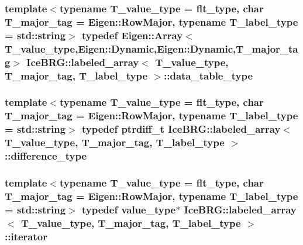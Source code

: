 \subsubsection[{data\+\_\+table\+\_\+type}]{\setlength{\rightskip}{0pt plus 5cm}template$<$typename T\+\_\+value\+\_\+type = flt\+\_\+type, char T\+\_\+major\+\_\+tag = Eigen\+::\+Row\+Major, typename T\+\_\+label\+\_\+type = std\+::string$>$ typedef Eigen\+::\+Array$<$T\+\_\+value\+\_\+type,Eigen\+::\+Dynamic,Eigen\+::\+Dynamic,T\+\_\+major\+\_\+tag$>$ {\bf Ice\+B\+R\+G\+::labeled\+\_\+array}$<$ T\+\_\+value\+\_\+type, T\+\_\+major\+\_\+tag, T\+\_\+label\+\_\+type $>$\+::{\bf data\+\_\+table\+\_\+type}}\label{classIceBRG_1_1labeled__array_a43d1c710fe591f9610ab9e9827aabba6}
\hypertarget{classIceBRG_1_1labeled__array_af916a9e5d8e921f4fd310618f065e0fd}{}
\subsubsection[{difference\+\_\+type}]{\setlength{\rightskip}{0pt plus 5cm}template$<$typename T\+\_\+value\+\_\+type = flt\+\_\+type, char T\+\_\+major\+\_\+tag = Eigen\+::\+Row\+Major, typename T\+\_\+label\+\_\+type = std\+::string$>$ typedef ptrdiff\+\_\+t {\bf Ice\+B\+R\+G\+::labeled\+\_\+array}$<$ T\+\_\+value\+\_\+type, T\+\_\+major\+\_\+tag, T\+\_\+label\+\_\+type $>$\+::{\bf difference\+\_\+type}}\label{classIceBRG_1_1labeled__array_af916a9e5d8e921f4fd310618f065e0fd}
\hypertarget{classIceBRG_1_1labeled__array_a15c8011c5051008033578e5e50e25820}{}
\subsubsection[{iterator}]{\setlength{\rightskip}{0pt plus 5cm}template$<$typename T\+\_\+value\+\_\+type = flt\+\_\+type, char T\+\_\+major\+\_\+tag = Eigen\+::\+Row\+Major, typename T\+\_\+label\+\_\+type = std\+::string$>$ typedef {\bf value\+\_\+type}$\ast$ {\bf Ice\+B\+R\+G\+::labeled\+\_\+array}$<$ T\+\_\+value\+\_\+type, T\+\_\+major\+\_\+tag, T\+\_\+label\+\_\+type $>$\+::{\bf iterator}}\label{classIceBRG_1_1labeled__array_a15c8011c5051008033578e5e50e25820}
\hypertarget{classIceBRG_1_1labeled__array_a6355a8e274be241162cfe4717bcd907f}{}

